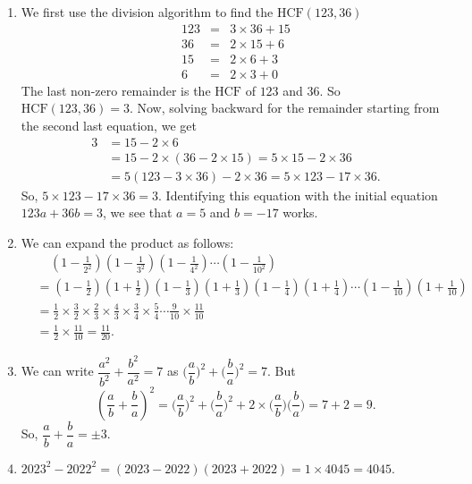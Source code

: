 \documentclass[12pt]{article}
\begin{document}
\begin{enumerate}[topsep=\bigskipamount,itemsep=\bigskipamount]
\item We first use the division algorithm to find the $\text{HCF}(123,36)$
\begin{eqnarray*}
    123 &=& 3\times 36 + 15\\
    36 &=& 2\times 15 + 6\\
    15 &=& 2\times 6 + 3\\
    6 &=& 2\times 3 + 0
\end{eqnarray*}
The last non-zero remainder is the $\text{HCF}$ of $123$ and $36$. So $\text{HCF}(123,36)=3$.
Now, solving backward for the remainder starting from the second last equation, we get 
\begin{align*}
    3 &= 15 - 2\times 6\\
    &= 15 - 2\times (36 - 2\times 15) = 5\times 15 - 2\times 36\\
    &= 5(123 - 3\times 36) -2\times 36 = 5\times 123 - 17\times 36.
\end{align*}
So, $5\times 123 - 17\times 36  = 3$.
Identifying this equation with the initial equation $123a + 36b=3$, we see that $a=5$ and $b=-17$ works.


\item We can expand the product as follows:
\begin{align*}
    &\mspace{20mu} \left(1-\frac{1}{2^2}\right) \left(1-\frac{1}{3^2}\right) \left(1-\frac{1}{4^2}\right) \dotsm \left(1-\frac{1}{10^2}\right) \\
    &= \left(1-\frac{1}{2}\right) \left(1+\frac{1}{2}\right) \left(1-\frac{1}{3}\right) \left(1+\frac{1}{3}\right) \left(1-\frac{1}{4}\right) \left(1+\frac{1}{4}\right) \dotsm \left(1-\frac{1}{10}\right) \left(1+\frac{1}{10}\right) \\
    &= \frac{1}{2} \times \frac{3}{2} \times \frac{2}{3} \times \frac{4}{3} \times \frac{3}{4} \times \frac{5}{4} \dotsm \frac{9}{10} \times \frac{11}{10} \\
    &= \frac{1}{2} \times \frac{11}{10} = \frac{11}{20}.
\end{align*}

\item We can write  $\dfrac{a^2}{b^2}+\dfrac{b^2}{a^2} = 7$ as $\bigg(\dfrac{a}{b}\bigg)^2 + \bigg(\dfrac{b}{a}\bigg)^2 = 7$.
But 
\begin{equation*}
 \left(\dfrac{a}{b}+  \dfrac{b}{a}\right)^2  =  \bigg(\dfrac{a}{b}\bigg)^2 + \bigg(\dfrac{b}{a}\bigg)^2  + 2\times \bigg(\dfrac{a}{b}\bigg) \bigg(\dfrac{b}{a}\bigg) = 7 + 2 =9.
\end{equation*}
So, $\dfrac{a}{b}+  \dfrac{b}{a} = \pm 3$.
\item $2023^2 -2022^2 = (2023-2022)(2023+2022) = 1 \times 4045 = 4045$.


\end{enumerate}
\end{document}
